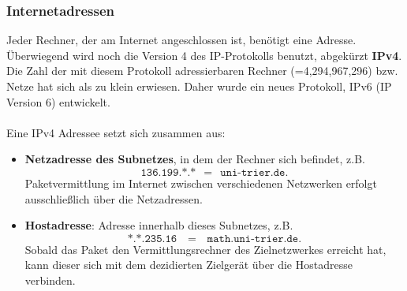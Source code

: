 \subsubsection{Internetadressen}
Jeder Rechner, der am Internet angeschlossen ist, benötigt eine Adresse. Überwiegend wird noch die Version 4 des IP-Protokolls benutzt, abgekürzt \textbf{IPv4}. Die Zahl der mit diesem Protokoll adressierbaren Rechner (=4,294,967,296) bzw. Netze hat sich als zu klein erwiesen. Daher wurde ein neues Protokoll, IPv6 (IP Version 6) entwickelt.
~\\~\\
Eine IPv4 Adressee setzt sich zusammen aus:

\begin{itemize}
	\item \textbf{Netzadresse des Subnetzes}, in dem der Rechner sich	befindet, z.B. $$\texttt{136.199.*.*} ~~= ~~\texttt{uni-trier.de}.$$ 
	Paketvermittlung im Internet zwischen verschiedenen Netzwerken erfolgt ausschließlich über die Netzadressen.
	\item \textbf{Hostadresse}: Adresse innerhalb dieses Subnetzes, z.B. $$\texttt{*.*.235.16 ~~=~~ math.uni-trier.de}.$$ 
	Sobald das Paket den Vermittlungsrechner des Zielnetzwerkes erreicht hat, kann dieser sich mit dem dezidierten Zielgerät über die Hostadresse verbinden.\\~\\
\end{itemize}

